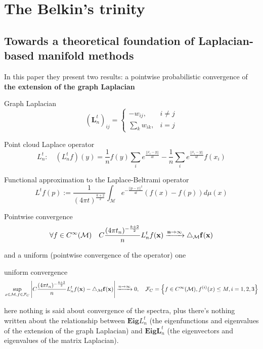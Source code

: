 
\section{The Belkin's trinity}
\subsection{Towards a theoretical foundation of Laplacian-based manifold methods}

In this paper they present two results: a pointwise probabilistic convergence of \textbf{the extension of the graph Laplacian} 
\begin{definition}{Graph Laplacian}
	$$ \left(\mathbf L_n^t\right)_{ij}=\begin{cases}
	-w_{ij}, & i\neq j\\
	\sum_{k}w_{ik}, & i=j
	\end{cases}$$
\end{definition}
\begin{definition}{Point cloud Laplace operator}
	$$L_n^t:\quad(L_n^tf)(y) = \frac{1}{n}f(y)\sum_i e^\frac{||x_i-y||}{4t}-\frac{1}{n}\sum_ie^\frac{||x_i-y||}{4t}f(x_i)$$
\end{definition}
\begin{definition}{Functional approximation to the Laplace-Beltrami operator} \label{eq:L^t}
	$$L^tf(p) :=  \frac{1}{ (4\pi t)^{\frac{k+2}{2}}} \int_\mathcal Me^{-\frac{||p-x||^2}{4t}}\left(f(x)-f(p)\right)d\mu(x)$$
\end{definition}

\begin{theorem}{Pointwise convergence}
	$$\forall f \in C^\infty(\mathcal M)\quad  C\frac{(4\pi t_n)^{-\frac{k+2}{2}}}{n} L_n^t f(\bf x) \xrightarrow{n\to\infty}\triangle_\mathcal M f(\bf x)$$
\end{theorem}


and a uniform (pointwise convergence of the operator) one
\begin{theorem}{uniform convergence}
	$$\sup_{x\in\mathcal M, f\in \mathcal F_C}\left| C\frac{(4\pi t_n)^{-\frac{k+2}{2}}}{n} L_n^t f(\bf x) - \triangle_\mathcal M f(\bf x) \right|\xrightarrow{n\to\infty}0
	, \quad \mathcal F_C = \left\{f\in C^\infty(\mathcal M), f^{(i)}(x)\leq M, i=1,2,3\right\}$$
\end{theorem}


here nothing is said about convergence of the spectra, plus there's nothing written about the relationship between $\mathbf{Eig} L_n^t$ (the eigenfunctions and eigenvalues of the extension of the graph Laplacian) and $\mathbf {Eig} \mathbf {L}_n^t$ (the eigenvectors and eigenvalues of the matrix Laplacian).

